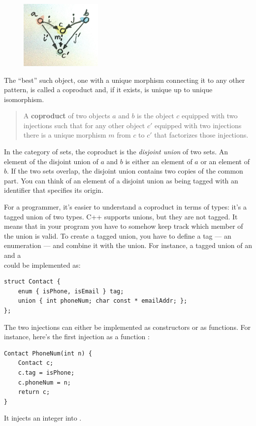 \begin{figure}[H]
\centering
\includegraphics[width=40mm]{images/coproductranking.jpg}
\end{figure}

\noindent
The ``best'' such object, one with a unique morphism connecting it to
any other pattern, is called a coproduct and, if it exists, is unique up
to unique isomorphism.

\begin{quote}
A \textbf{coproduct} of two objects $a$ and $b$ is the object
$c$ equipped with two injections such that for any other object
$c'$ equipped with two injections there is a unique morphism
$m$ from $c$ to $c'$ that factorizes those injections.
\end{quote}

\noindent
In the category of sets, the coproduct is the \emph{disjoint union} of
two sets. An element of the disjoint union of $a$ and $b$ is
either an element of $a$ or an element of $b$. If the two sets
overlap, the disjoint union contains two copies of the common part. You
can think of an element of a disjoint union as being tagged with an
identifier that specifies its origin.

For a programmer, it's easier to understand a coproduct in terms of
types: it's a tagged union of two types. C++ supports unions, but they
are not tagged. It means that in your program you have to somehow keep
track which member of the union is valid. To create a tagged union, you
have to define a tag --- an enumeration --- and combine it with the
union. For instance, a tagged union of an  and a\\
 could be implemented as:

\begin{Verbatim}
struct Contact { 
    enum { isPhone, isEmail } tag;
    union { int phoneNum; char const * emailAddr; };
};
\end{Verbatim}
The two injections can either be implemented as constructors or as
functions. For instance, here's the first injection as a function
:

\begin{Verbatim}
Contact PhoneNum(int n) { 
    Contact c;
    c.tag = isPhone;
    c.phoneNum = n;
    return c;
}
\end{Verbatim}
It injects an integer into .

